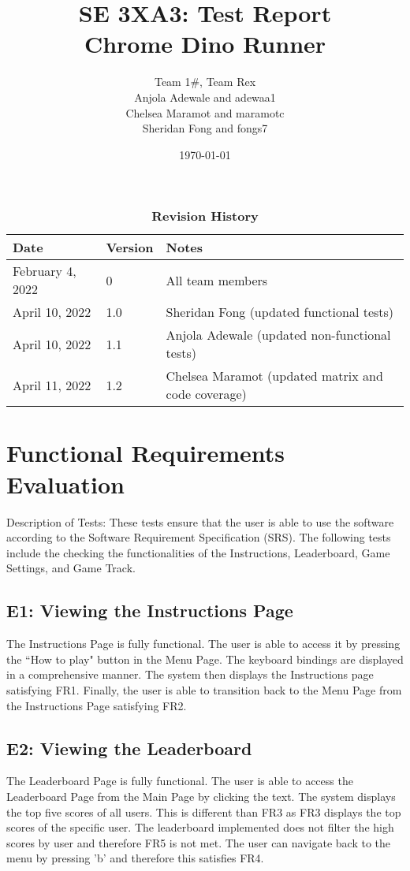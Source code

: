 \documentclass[12pt, titlepage]{article}
\title{SE 3XA3: Test Report\\Chrome Dino Runner}
\author{Team 1\#, Team Rex
		\\ Anjola Adewale and adewaa1
		\\ Chelsea Maramot and maramotc
		\\ Sheridan Fong and fongs7
}
\date{\today}
\begin{document}
\maketitle

\tableofcontents
\listoftables
\listoffigures


\newpage

\newpage
\begin{table}[h]
\caption{\bf Revision History}
\begin{tabularx}{\textwidth}{p{3cm}p{2cm}X}
    \toprule {\bf Date} & {\bf Version} & {\bf Notes}\\
    \midrule
    February 4, 2022 & 0 & All team members\\
    \midrule
    April 10, 2022 & 1.0 & Sheridan Fong (updated functional tests)\\
    \midrule
    April 10, 2022 & 1.1 & Anjola Adewale (updated non-functional tests)\\
    \midrule
    April 11, 2022 & 1.2 & Chelsea Maramot (updated matrix and code coverage)\\
    \bottomrule
    
\end{tabularx}
\end{table}
\newpage

\section{Functional Requirements Evaluation}

Description of Tests: These tests ensure that the user is able to use the software according to the Software Requirement Specification (SRS). The following tests include the checking the functionalities of the Instructions, Leaderboard, Game Settings, and Game Track.

\subsection{E1: Viewing the Instructions Page}
The Instructions Page is fully functional. The user is able to access it by pressing the ``How to play" button in the Menu Page. The keyboard bindings are displayed in a comprehensive manner. The system then displays the Instructions page satisfying FR1. Finally, the user is able to transition back to the Menu Page from the Instructions Page satisfying FR2.

\subsection{E2: Viewing the Leaderboard}
The Leaderboard Page is fully functional. The user is able to access the Leaderboard Page from the Main Page by clicking the text. The system displays the top five scores of all users. This is different than FR3 as FR3 displays the top scores of the specific user. The leaderboard implemented does not filter the high scores by user and therefore FR5 is not met. The user can navigate back to the menu by pressing 'b' and therefore this satisfies FR4. 
\end{document}
